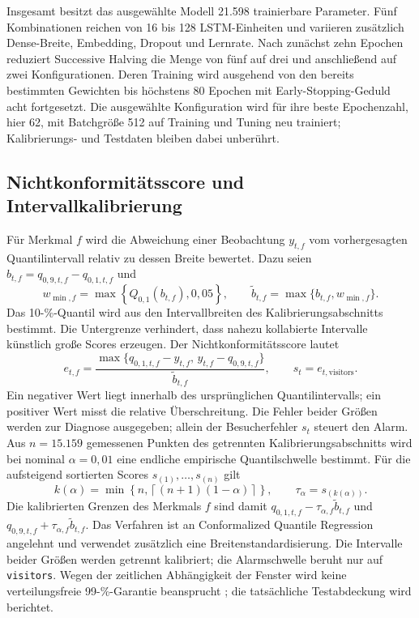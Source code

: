 Insgesamt besitzt das ausgewählte Modell 21.598 trainierbare Parameter. Fünf
Kombinationen reichen von 16 bis 128 LSTM-Einheiten und variieren zusätzlich
Dense-Breite, Embedding, Dropout und Lernrate. Nach zunächst zehn Epochen
reduziert Successive Halving die Menge von fünf auf drei und anschließend auf
zwei Konfigurationen. Deren Training wird ausgehend von den bereits bestimmten
Gewichten bis höchstens 80 Epochen mit Early-Stopping-Geduld acht fortgesetzt.
Die ausgewählte Konfiguration wird für
ihre beste Epochenzahl, hier 62, mit Batchgröße 512 auf Training und Tuning neu
trainiert; Kalibrierungs- und Testdaten bleiben dabei unberührt.

\subsection{Nichtkonformitätsscore und Intervallkalibrierung}

Für Merkmal $f$ wird die Abweichung einer Beobachtung $y_{t,f}$ vom
vorhergesagten Quantilintervall relativ zu dessen Breite bewertet. Dazu seien
$b_{t,f}=q_{0{,}9,t,f}-q_{0{,}1,t,f}$ und
\begin{equation}
 w_{\min,f}=\max\!\left\{Q_{0{,}1}\!\left(b_{t,f}\right),0{,}05\right\},
 \qquad \widetilde b_{t,f}=\max\{b_{t,f},w_{\min,f}\}.
\end{equation}
Das 10-\%-Quantil wird aus den Intervallbreiten des Kalibrierungsabschnitts
bestimmt. Die Untergrenze verhindert, dass nahezu kollabierte Intervalle
künstlich große Scores erzeugen. Der Nichtkonformitätsscore lautet
\begin{equation}
 e_{t,f}=\frac{\max\{q_{0{,}1,t,f}-y_{t,f},\,
 y_{t,f}-q_{0{,}9,t,f}\}}
 {\widetilde b_{t,f}},
 \qquad s_t=e_{t,\mathrm{visitors}}.
\end{equation}
Ein negativer Wert liegt innerhalb des ursprünglichen Quantilintervalls; ein
positiver Wert misst die relative Überschreitung. Die Fehler beider Größen
werden zur Diagnose ausgegeben; allein der Besucherfehler $s_t$ steuert den
Alarm. Aus $n=15.159$ gemessenen Punkten des getrennten
Kalibrierungsabschnitts wird bei nominal $\alpha=0{,}01$ eine endliche
empirische Quantilschwelle bestimmt. Für die aufsteigend sortierten Scores
$s_{(1)},\ldots,s_{(n)}$ gilt
\begin{equation}
 k(\alpha)=\min\!\left\{n,\left\lceil(n+1)(1-\alpha)\right\rceil\right\},
 \qquad \tau_{\alpha}=s_{(k(\alpha))}.
\end{equation}
Die kalibrierten Grenzen des Merkmals $f$ sind damit
$q_{0{,}1,t,f}-\tau_{\alpha,f}\widetilde b_{t,f}$ und
$q_{0{,}9,t,f}+\tau_{\alpha,f}\widetilde b_{t,f}$. Das
Verfahren ist an Conformalized Quantile Regression angelehnt
\cite{romano2019cqr} und verwendet zusätzlich eine Breitenstandardisierung.
Die Intervalle beider Größen werden getrennt kalibriert; die Alarmschwelle
beruht nur auf \texttt{visitors}. Wegen der zeitlichen Abhängigkeit der
Fenster wird keine verteilungsfreie 99-\%-Garantie beansprucht
\cite{barber2023beyond}; die tatsächliche Testabdeckung wird berichtet.

